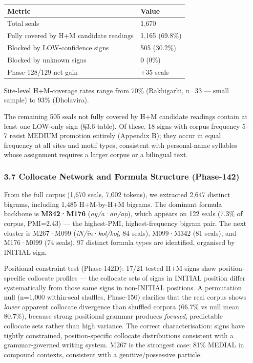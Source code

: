 \documentclass[
]{article}
\newcounter{none} %
\begin{document}
{\def\LTcaptype{none} %
\begin{longtable}[]{@{}ll@{}}
\toprule\noalign{}
Metric & Value \\
\midrule\noalign{}
\endhead
\bottomrule\noalign{}
\endlastfoot
Total seals & 1,670 \\
Fully covered by H+M candidate readings & 1,165 (69.8\%) \\
Blocked by LOW-confidence signs & 505 (30.2\%) \\
Blocked by unknown signs & 0 (0\%) \\
Phase-128/129 net gain & +35 seals \\
\end{longtable}
}

Site-level H+M-coverage rates range from 70\% (Rakhigarhi, n=33 ---
small sample) to 93\% (Dholavira).

The remaining 505 seals not fully covered by H+M candidate readings contain at least one LOW-only sign (§3.6 table). Of these, 18 signs with corpus frequency 5--7 resist MEDIUM promotion entirely (Appendix B); they occur in equal frequency at all sites and motif types, consistent with personal-name syllables whose assignment requires a larger corpus or a bilingual text.

\subsubsection{3.7 Collocate Network and Formula Structure
(Phase-142)}\label{collocate-network-and-formula-structure-phase-142}

From the full corpus (1,670 seals, 7,002 tokens), we extracted 2,647
distinct bigrams, including 1,485 H+M-by-H+M bigrams. The dominant formula
backbone is \textbf{M342·M176} (\emph{ay/ā}·\emph{an/aṇ}), which appears
on 122 seals (7.3\% of corpus, PMI=2.43) --- the highest-PMI,
highest-frequency bigram pair. The next cluster is M267·M099
(\emph{iN/in}·\emph{kol/koḷ}, 84 seals), M099·M342 (81 seals), and
M176·M099 (74 seals). 97 distinct formula types are identified,
organised by INITIAL sign.

Positional constraint test (Phase-142D): 17/21 tested H+M signs show
position-specific collocate profiles --- the collocate sets of signs in
INITIAL position differ systematically from those same signs in
non-INITIAL positions. A permutation null (n=1,000 within-seal shuffles,
Phase-150) clarifies that the real corpus shows \emph{lower} apparent
collocate divergence than shuffled corpora (66.7\% vs null mean 80.7\%),
because strong positional grammar produces \emph{focused}, predictable
collocate sets rather than high variance. The correct characterisation:
signs have tightly constrained, position-specific collocate
distributions consistent with a grammar-governed writing system. M267 is
the strongest case: 81\% MEDIAL in compound contexts, consistent with a
genitive/possessive particle.
\end{document}
